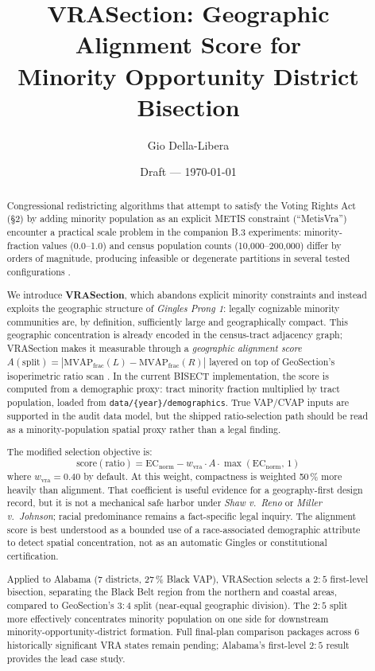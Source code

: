 \documentclass[12pt]{article}
\title{VRASection: Geographic Alignment Score for\\
       Minority Opportunity District Bisection}
\author{Gio Della-Libera}
\date{Draft --- \today}
\begin{document}
\maketitle

\begin{abstract}
Congressional redistricting algorithms that attempt to satisfy the Voting
Rights Act (\S 2) by adding minority population as an explicit METIS
constraint (``MetisVra'') encounter a practical scale problem in the
companion B.3 experiments: minority-fraction values (0.0--1.0) and census
population counts (10,000--200,000) differ by orders of magnitude, producing
infeasible or degenerate partitions in several tested configurations
\citep{b3paper}.

We introduce \textbf{VRASection}, which abandons explicit minority constraints
and instead exploits the geographic structure of \emph{Gingles Prong 1}:
legally cognizable minority communities are, by definition, sufficiently
large and geographically compact.
This geographic concentration is already encoded in the census-tract adjacency
graph; VRASection makes it measurable through a \emph{geographic alignment score}
$A(\text{split}) = |\text{MVAP}_\text{frac}(L) - \text{MVAP}_\text{frac}(R)|$
layered on top of GeoSection's isoperimetric ratio scan \citep{b8paper}.
In the current BISECT implementation, the score is computed from a demographic
proxy: tract minority fraction multiplied by tract population, loaded from
\texttt{data/\{year\}/demographics}.  True VAP/CVAP inputs are supported in
the audit data model, but the shipped ratio-selection path should be read as a
minority-population spatial proxy rather than a legal finding.

The modified selection objective is:
\[
  \text{score}(\text{ratio}) = \mathrm{EC}_{\text{norm}} - w_\text{vra}
  \cdot A \cdot \max(\mathrm{EC}_{\text{norm}},\, 1)
\]
where $w_\text{vra} = 0.40$ by default.
At this weight, compactness is weighted 50\,\% more heavily than alignment.
That coefficient is useful evidence for a geography-first design record, but
it is not a mechanical safe harbor under \emph{Shaw v.\ Reno} or
\emph{Miller v.\ Johnson}; racial predominance remains a fact-specific legal
inquiry.  The alignment score is best understood as a bounded use of a
race-associated demographic attribute to detect spatial concentration, not as
an automatic Gingles or constitutional certification.

Applied to Alabama (7 districts, 27\,\% Black VAP), VRASection selects
a $2:5$ first-level bisection, separating the Black Belt region from the
northern and coastal areas, compared to GeoSection's $3:4$ split
(near-equal geographic division).
The $2:5$ split more effectively concentrates minority population on one
side for downstream minority-opportunity-district formation.
Full final-plan comparison packages across 6 historically significant VRA
states remain pending; Alabama's first-level $2:5$ result provides the lead
case study.


\end{abstract}
\end{document}
